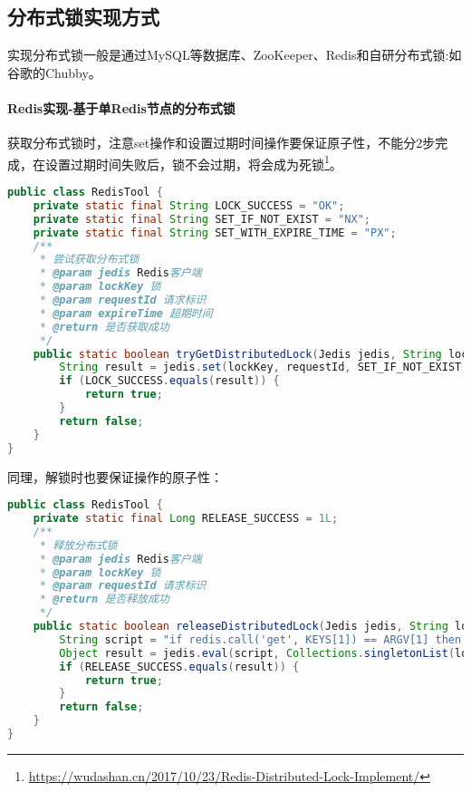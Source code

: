 \documentclass[../../../interview-questions.tex]{subfiles}
\begin{document}
\subsection{分布式锁实现方式}

实现分布式锁一般是通过MySQL等数据库、ZooKeeper、Redis和自研分布式锁:如谷歌的Chubby。

\paragraph{Redis实现-基于单Redis节点的分布式锁}

获取分布式锁时，注意set操作和设置过期时间操作要保证原子性，不能分2步完成，在设置过期时间失败后，锁不会过期，将会成为死锁\footnote{\url{https://wudashan.cn/2017/10/23/Redis-Distributed-Lock-Implement/}}。

\begin{lstlisting}[language=Java]
public class RedisTool {
    private static final String LOCK_SUCCESS = "OK";
    private static final String SET_IF_NOT_EXIST = "NX";
    private static final String SET_WITH_EXPIRE_TIME = "PX";
    /**
     * 尝试获取分布式锁
     * @param jedis Redis客户端
     * @param lockKey 锁
     * @param requestId 请求标识
     * @param expireTime 超期时间
     * @return 是否获取成功
     */
    public static boolean tryGetDistributedLock(Jedis jedis, String lockKey, String requestId, int expireTime) {
        String result = jedis.set(lockKey, requestId, SET_IF_NOT_EXIST, SET_WITH_EXPIRE_TIME, expireTime);
        if (LOCK_SUCCESS.equals(result)) {
            return true;
        }
        return false;
    }
}
\end{lstlisting}

同理，解锁时也要保证操作的原子性：

\begin{lstlisting}[language=Java]
public class RedisTool {
    private static final Long RELEASE_SUCCESS = 1L;
    /**
     * 释放分布式锁
     * @param jedis Redis客户端
     * @param lockKey 锁
     * @param requestId 请求标识
     * @return 是否释放成功
     */
    public static boolean releaseDistributedLock(Jedis jedis, String lockKey, String requestId) {
        String script = "if redis.call('get', KEYS[1]) == ARGV[1] then return redis.call('del', KEYS[1]) else return 0 end";
        Object result = jedis.eval(script, Collections.singletonList(lockKey), Collections.singletonList(requestId));
        if (RELEASE_SUCCESS.equals(result)) {
            return true;
        }
        return false;
    }
}
\end{lstlisting}
\end{document}
